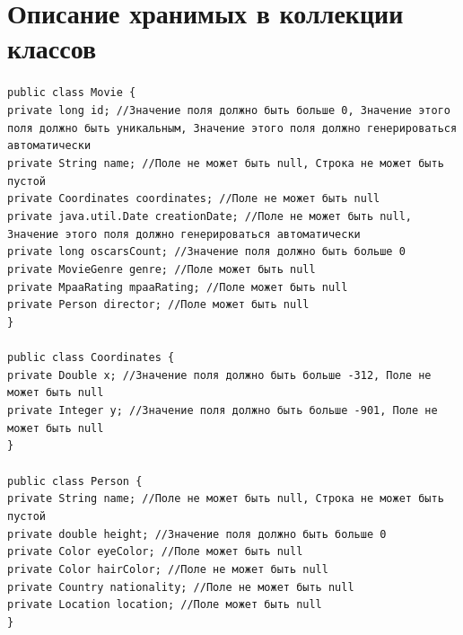 \newpage

\section{Описание хранимых в коллекции классов}
\noindent\texttt{рublic class Movie \{ \\
    private long id; //Значение поля должно быть больше 0, Значение этого поля должно быть уникальным, Значение этого поля должно генерироваться автоматически\\
    private String name; //Поле не может быть null, Строка не может быть пустой\\
    private Coordinates coordinates; //Поле не может быть null\\
    private java.util.Date creationDate; //Поле не может быть null, Значение этого поля должно генерироваться автоматически\\
    private long oscarsCount; //Значение поля должно быть больше 0\\
    private MovieGenre genre; //Поле может быть null\\
    private MpaaRating mpaaRating; //Поле может быть null\\
    private Person director; //Поле может быть null\\
    \} \\
    \\
    public class Coordinates \{ \\
    private Double x; //Значение поля должно быть больше -312, Поле не может быть null\\
    private Integer y; //Значение поля должно быть больше -901, Поле не может быть null\\
    \} \\
    \\
    public class Person \{ \\
    private String name; //Поле не может быть null, Строка не может быть пустой\\
    private double height; //Значение поля должно быть больше 0\\
    private Color eyeColor; //Поле может быть null\\
    private Color hairColor; //Поле не может быть null\\
    private Country nationality; //Поле не может быть null\\
    private Location location; //Поле может быть null\\
    \} \\
    \\
}

